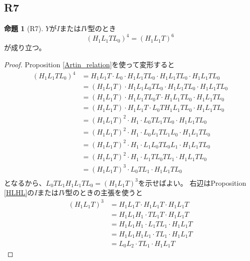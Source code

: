 \documentclass[uplatex, a4paper, dvipdfmx]{jsarticle}
\theoremstyle{definition}
\newtheorem{proposition}[theorem]{命題}
\begin{document}
\subsection{R7}
\begin{proposition}[R7]
    $Y$が$I$または$IV$型のとき
    \begin{equation}
        (H_1L_1TL_0)^4 = (H_1L_1T)^6
    \end{equation}
    が成り立つ。
\end{proposition}
\begin{proof}
    Proposition \ref{Artin_relation}を使って変形すると
    \begin{align}
        (H_1L_1TL_0)^4 & =H_1L_1T \cdot L_0 \cdot H_1L_1TL_0 \cdot H_1L_1TL_0 \cdot H_1L_1TL_0 \\
                       & =(H_1L_1T) \cdot H_1L_1L_0TL_0 \cdot H_1L_1TL_0 \cdot H_1L_1TL_0      \\
                       & =(H_1L_1T) \cdot H_1L_1TL_0T \cdot H_1L_1TL_0 \cdot H_1L_1TL_0        \\
                       & =(H_1L_1T) \cdot H_1L_1T \cdot L_0TH_1L_1TL_0 \cdot H_1L_1TL_0        \\
                       & =(H_1L_1T)^2 \cdot H_1\cdot L_0TL_1TL_0 \cdot H_1L_1TL_0              \\
                       & =(H_1L_1T)^2 \cdot H_1\cdot L_0L_1TL_1L_0 \cdot H_1L_1TL_0            \\
                       & =(H_1L_1T)^2 \cdot H_1\cdot L_1L_0TL_0L_1 \cdot H_1L_1TL_0            \\
                       & =(H_1L_1T)^2 \cdot H_1\cdot L_1TL_0TL_1 \cdot H_1L_1TL_0              \\
                       & =(H_1L_1T)^3 \cdot L_0TL_1 \cdot H_1L_1TL_0                           \\
    \end{align}
    となるから、$L_0TL_1H_1L_1TL_0=(H_1L_1T)^3$を示せばよい。
    右辺はProposition \ref{HLHL}の$I$または$IV$型のときの主張を使うと
    \begin{align}
        (H_1L_1T)^3 & = H_1L_1T \cdot H_1L_1T \cdot H_1L_1T   \\
                    & = H_1L_1H_1 \cdot TL_1T \cdot H_1L_1T   \\
                    & = H_1L_1H_1 \cdot L_1TL_1 \cdot H_1L_1T \\
                    & = H_1L_1H_1L_1\cdot TL_1 \cdot H_1L_1T  \\
                    & = L_0L_2\cdot TL_1 \cdot H_1L_1T

\end{align}
\end{proof}
\end{document}
